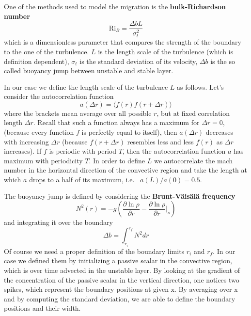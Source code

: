 One of the methods used to model the migration is the \textbf{bulk-Richardson number}
\begin{equation}\label{bulkrichardson}
	\mathrm{Ri}_{B}=\frac{\Delta b L}{\sigma_t^2}
\end{equation}
which is a dimensionless parameter that compares the strength of the boundary to the one of the turbulence. $L$ is the length scale of the turbulence (which is definition dependent), $\sigma_t$ is the standard deviation of its velocity, $\Delta b$ is the so called buoyancy jump between unstable and stable layer.

In our case we define the length scale of the turbulence $L$ as follows. Let's consider the autocorrelation function 
\begin{equation}\label{correlation}
	a(\Delta r)= \langle f(r) f(r + \Delta r) \rangle
\end{equation}
where the brackets mean average over all possible $r$, but at fixed correlation length $\Delta r$. Recall that such a function always has a maximum for $\Delta r=0$, (because every function $f$ is perfectly equal to itself), then $a(\Delta r)$ decreases with increasing $\Delta r$ (because $f(r+\Delta r)$ resembles less and less $f(r)$ as $\Delta r$ increases). If $f$ is periodic with period $T$, then the autocorrelation function $a$ has maximum with periodicity $T$. In order to define $L$ we autocorrelate the mach number in the horizontal direction of the convective region and take the length at which $a$ drops to a half of its maximum, i.e. \ $a(L)/a(0)=0.5$.

The buoyancy jump is defined by considering the \textbf{Brunt-Väisälä frequency} 
\begin{equation}
	N^2(r)=-g \left (  \frac{\partial \ln \rho}{\partial r} -  \frac{\partial \ln \rho}{\partial r} \Big|_{s}  \right )
\end{equation}
and integrating it over the boundary
\begin{equation}
	\Delta b = \int_{r_i}^{r_f} N^2 dr
\end{equation}
Of course we need a proper definition of the boundary limits $r_i$ and $r_f$. In our case we defined them by initializing a passive scalar in the convective region, which is over time advected in the unstable layer. By looking at the gradient of the concentration of the passive scalar in the vertical direction, one notices two spikes, which represent the boundary positions at given $\mathrm{x}$. By averaging over $\mathrm{x}$ and by computing the standard deviation, we are able to define the boundary positions and their width.

